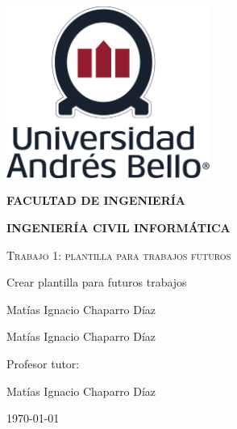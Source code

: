 \begin{titlepage}
    \centering
    {\includegraphics[width=0.5\textwidth]{imgs/unabLogos/unabFrontPageLogo.png}\par}
    \vspace{1cm}
    {\textbf{FACULTAD DE INGENIERÍA}\par}
    {\textbf{INGENIERÍA CIVIL INFORMÁTICA} \par}
    \vspace{1cm}
    {\scshape\Huge Trabajo 1: plantilla para trabajos futuros\par}
    \vspace{2cm}
    {\LARGE Crear plantilla para futuros trabajos\par}
    \vfill
    {\Large Matías Ignacio Chaparro Díaz \par}
    {\Large Matías Ignacio Chaparro Díaz \par}
    \vfill
    {\Large Profesor tutor: \par}
    {\Large Matías Ignacio Chaparro Díaz\par}
    \vspace{1cm}
    \vfill
    {\Large \today \par}
\end{titlepage}
 